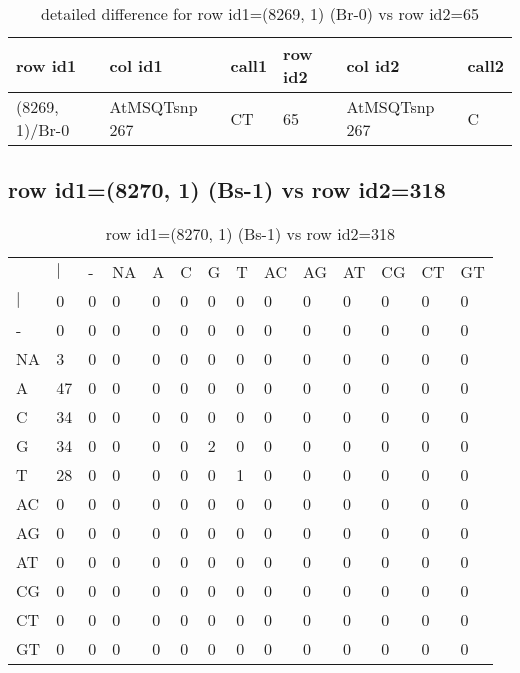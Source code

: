 \begin{center}
\begin{longtable}{|l|l|l|l|l|l|}
\caption{detailed difference for row id1=(8269, 1) (Br-0) vs row id2=65} \label{table_dm221}\\
\hline
row id1&col id1&call1&row id2&col id2&call2\\
\hline
(8269, 1)/Br-0&AtMSQTsnp 267&CT&65&AtMSQTsnp 267&C\\
\hline
\end{longtable}
\end{center}

\subsection{row id1=(8270, 1) (Bs-1) vs row id2=318}
\begin{center}
\begin{longtable}{|l|l|l|l|l|l|l|l|l|l|l|l|l|l|}
\caption{row id1=(8270, 1) (Bs-1) vs row id2=318} \label{table_dm222}\\
\hline
\\
\hline
&$|$&-&NA&A&C&G&T&AC&AG&AT&CG&CT&GT\\
$|$&0&0&0&0&0&0&0&0&0&0&0&0&0\\
-&0&0&0&0&0&0&0&0&0&0&0&0&0\\
NA&3&0&0&0&0&0&0&0&0&0&0&0&0\\
A&47&0&0&0&0&0&0&0&0&0&0&0&0\\
C&34&0&0&0&0&0&0&0&0&0&0&0&0\\
G&34&0&0&0&0&2&0&0&0&0&0&0&0\\
T&28&0&0&0&0&0&1&0&0&0&0&0&0\\
AC&0&0&0&0&0&0&0&0&0&0&0&0&0\\
AG&0&0&0&0&0&0&0&0&0&0&0&0&0\\
AT&0&0&0&0&0&0&0&0&0&0&0&0&0\\
CG&0&0&0&0&0&0&0&0&0&0&0&0&0\\
CT&0&0&0&0&0&0&0&0&0&0&0&0&0\\
GT&0&0&0&0&0&0&0&0&0&0&0&0&0\\
\hline
\end{longtable}
\end{center}

